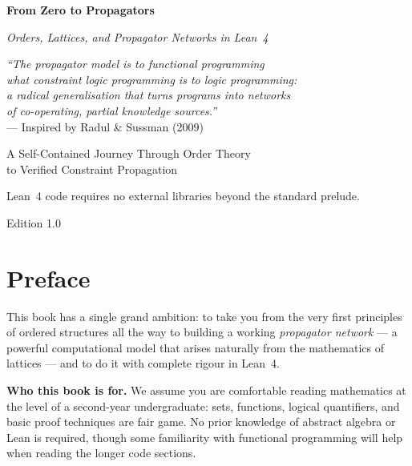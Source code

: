 \documentclass[12pt, a4paper, openright]{book}
\theoremstyle{thmstyle}
\theoremstyle{defstyle}
\begin{document}
\frontmatter

\begin{titlepage}
  \centering
  \vspace*{2cm}
  {\Huge\bfseries From Zero to Propagators\par}
  \vspace{0.5cm}
  {\large\itshape Orders, Lattices, and Propagator Networks in Lean~4\par}
  \vspace{3cm}
  \begin{tcolorbox}[width=0.75\textwidth,
                    colback=gray!8, colframe=gray!50, arc=4pt,
                    boxrule=0.6pt]
    \small\centering
    \textit{``The propagator model is to functional programming\\
    what constraint logic programming is to logic programming:\\
    a radical generalisation that turns programs into networks\\
    of co-operating, partial knowledge sources.''}\\[4pt]
    --- Inspired by Radul \& Sussman (2009)
  \end{tcolorbox}
  \vfill
  {\large A Self-Contained Journey Through Order Theory\\
  to Verified Constraint Propagation\par}
  \vspace{1cm}
  {\normalsize Lean~4 code requires no external libraries beyond the standard prelude.\par}
  \vspace{0.5cm}
  {\small\color{gray} Edition 1.0\par}
\end{titlepage}

\chapter*{Preface}

This book has a single grand ambition: to take you from the very first
principles of ordered structures all the way to building a working
\emph{propagator network} --- a powerful computational model that arises
naturally from the mathematics of lattices --- and to do it with
complete rigour in Lean~4.

\medskip
\textbf{Who this book is for.}
We assume you are comfortable reading mathematics at the level of a second-year
undergraduate: sets, functions, logical quantifiers, and basic proof
techniques are fair game. No prior knowledge of abstract algebra or Lean is
required, though some familiarity with functional programming will help when
reading the longer code sections.
\end{document}
